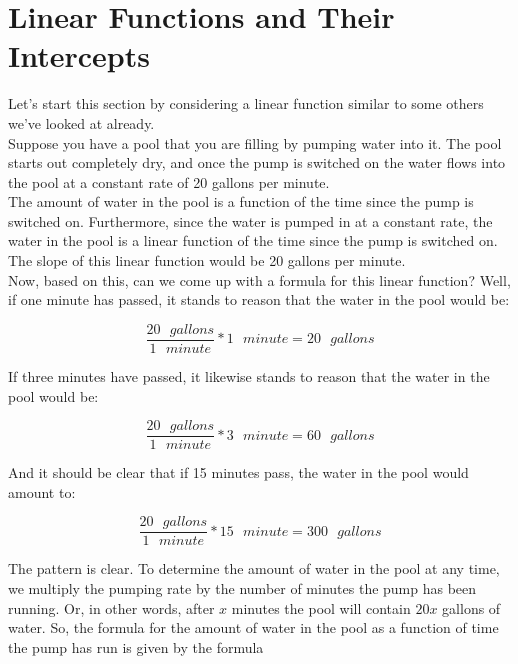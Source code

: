 %
%

\section{Linear Functions and Their Intercepts}
\label{LinearFunctionsandIntercepts}

Let’s start this section by considering a linear function similar to some others we’ve looked at already.\\

Suppose you have a pool that you are filling by pumping water into it. The pool starts out completely dry, and once the pump is switched on the water flows into the pool at a constant rate of 20 gallons per minute.\\

The amount of water in the pool is a function of the time since the pump is switched on.  Furthermore, since the water is pumped in at a constant rate, the water in the pool is a linear function of the time since the pump is switched on. The slope of this linear function would be 20 gallons per minute.\\

Now, based on this, can we come up with a formula for this linear function? Well, if one minute has passed, it stands to reason that the water in the pool would be:

\begin{equation*}
	\frac{20 \text{ }gallons}{1 \text{ } minute}*1\text{ }minute = 20\text{ }gallons
\end{equation*}

If three minutes have passed, it likewise stands to reason that the water in the pool would be:

\begin{equation*}
	\frac{20 \text{ }gallons}{1 \text{ } minute}*3\text{ }minute = 60\text{ }gallons
\end{equation*}

And it should be clear that if 15 minutes pass, the water in the pool would amount to:

\begin{equation*}
	\frac{20 \text{ }gallons}{1 \text{ } minute}*15\text{ }minute = 300\text{ }gallons
\end{equation*}

The pattern is clear. To determine the amount of water in the pool at any time, we multiply the pumping rate by the number of minutes the pump has been running. Or, in other words, after $x$ minutes the pool will contain $20x$ gallons of water. So, the formula for the amount of water in the pool as a function of time the pump has run is given by the formula 

